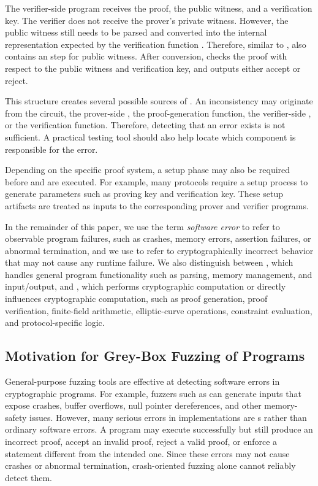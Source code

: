 The verifier-side program \vprog receives the proof, the public witness, and a verification key. The verifier does not receive the prover's private witness. However, the public witness still needs to be parsed and converted into the internal representation expected by the verification function \vfunc. Therefore, similar to \pprog, \vprog also contains an  step for public witness. After conversion, \vfunc checks the proof with respect to the public witness and verification key, and outputs either accept or reject.

This structure creates several possible sources of \logicerror. An inconsistency may originate from the circuit, the prover-side , the proof-generation function, the verifier-side , or the verification function. Therefore, detecting that an error exists is not sufficient. A practical testing tool should also help locate which component is responsible for the error.

Depending on the specific proof system, a setup phase may also be required before \pprog and \vprog are executed. For example, many \zksnark protocols require a setup process to generate parameters such as proving key and verification key. These setup artifacts are treated as inputs to the corresponding prover and verifier programs.

In the remainder of this paper, we use the term \emph{software error} to refer to observable program failures, such as crashes, memory errors, assertion failures, or abnormal termination, and we use \logicerror{} to refer to cryptographically incorrect behavior that may not cause any runtime failure. We also distinguish between \programbranch, which handles general program functionality such as parsing, memory management, and input/output, and \cryptobranch, which performs cryptographic computation or directly influences cryptographic computation, such as proof generation, proof verification, finite-field arithmetic, elliptic-curve operations, constraint evaluation, and protocol-specific logic.

\subsection{Motivation for Grey-Box Fuzzing of \zksnark Programs}
\label{subsec:greybox-motivation_greybox}
General-purpose fuzzing tools are effective at detecting software errors in cryptographic programs. For example, fuzzers such as \afl can generate inputs that expose crashes, buffer overflows, null pointer dereferences, and other memory-safety issues. However, many serious errors in \zksnark implementations are \logicerror{}s rather than ordinary software errors. A \zksnark program may execute successfully but still produce an incorrect proof, accept an invalid proof, reject a valid proof, or enforce a statement different from the intended one. Since these errors may not cause crashes or abnormal termination, crash-oriented fuzzing alone cannot reliably detect them.

